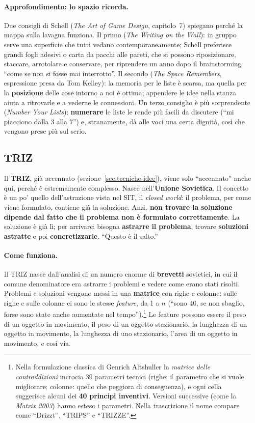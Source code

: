 \paragraph{Approfondimento: lo spazio ricorda.} Due consigli di Schell
(\emph{The Art of Game Design}, capitolo~7) spiegano perché la mappa sulla
lavagna funziona. Il primo (\emph{The Writing on the Wall}): in gruppo serve
una superficie che tutti vedano contemporaneamente; Schell preferisce grandi
fogli adesivi o carta da pacchi alle pareti, che si possono riposizionare,
staccare, arrotolare e conservare, per riprendere un anno dopo il
brainstorming ``come se non si fosse mai interrotto''. Il secondo
(\emph{The Space Remembers}, espressione presa da Tom Kelley): la memoria per
le liste è scarsa, ma quella per la \textbf{posizione} delle cose intorno a
noi è ottima; appendere le idee nella stanza aiuta a ritrovarle e a vederne
le connessioni. Un terzo consiglio è più sorprendente
(\emph{Number Your Lists}): \textbf{numerare} le liste le rende più facili da
discutere (``mi piacciono dalla 3 alla 7'') e, stranamente, dà alle voci una
certa dignità, così che vengono prese più sul serio.

\subsection{TRIZ}
\label{sec:triz}

Il \textbf{TRIZ}, già accennato (sezione~\ref{sec:tecniche-idee}), viene
solo ``accennato'' anche qui, perché è estremamente complesso. Nasce
nell'\textbf{Unione Sovietica}. Il concetto è un po' quello dell'astrazione
vista nel SIT, il \emph{closed world}: il problema, per come viene
formulato, contiene già la soluzione. Anzi, \textbf{non trovare la soluzione
dipende dal fatto che il problema non è formulato correttamente}. La
soluzione è già lì; per arrivarci bisogna \textbf{astrarre il problema},
trovare \textbf{soluzioni astratte} e poi \textbf{concretizzarle}. ``Questo è
il salto.''

\paragraph{Come funziona.} Il TRIZ nasce dall'analisi di un numero enorme di
\textbf{brevetti} sovietici, in cui il comune denominatore era astrarre i
problemi e vedere come erano stati risolti. Problemi e soluzioni vengono
messi in una \textbf{matrice} con righe e colonne: sulle righe e sulle
colonne ci sono le stesse \emph{feature}, da 1 a $n$ (``sono 40, se non
sbaglio, forse sono state anche aumentate nel
tempo'').\footnote{Nella formulazione classica di Genrich Altshuller la
\emph{matrice delle contraddizioni} incrocia 39 parametri tecnici (righe:
il parametro che si vuole migliorare; colonne: quello che peggiora di
conseguenza), e ogni cella suggerisce alcuni dei \textbf{40 principi
inventivi}. Versioni successive (come la \emph{Matrix 2003}) hanno esteso i
parametri. Nella trascrizione il nome compare come ``Drizzt'', ``TRIPS'' e
``TRIZZE''.} Le feature possono essere il peso di un oggetto in movimento,
il peso di un oggetto stazionario, la lunghezza di un oggetto in movimento,
la lunghezza di uno stazionario, l'area di un oggetto in movimento, e così
via.

